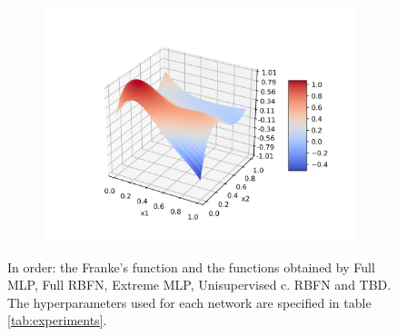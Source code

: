 \documentclass[a4paper]{article}
\numberwithin{equation}{section} %
\numberwithin{figure}{section} %
\numberwithin{table}{section} %
\theoremstyle{definition}
\begin{document}
\begin{figure}[H]
\begin{subfigure}{.32\textwidth}
	\end{subfigure}
  \begin{subfigure}{.32\textwidth}
    \centering
    \includegraphics[width=1.0\linewidth]{images/RBFN_BLOCK_N_50_sigma_05_rho_1e-05.png}
  \end{subfigure}
	\caption{In order: the Franke's function and the functions obtained by
		Full MLP, Full RBFN, Extreme MLP, Unisupervised c. RBFN and TBD.
		The hyperparameters used for each network are specified in table
		\ref{tab:experiments}.}
	\label{fig:plots}
\end{figure}


%
%

\end{document}
